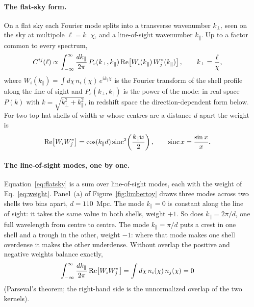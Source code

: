 \documentclass[11pt]{article}
\begin{document}
\paragraph{The flat-sky form.}
On a flat sky each Fourier mode splits into a transverse wavenumber
$k_\perp$, seen on the sky at multipole $\ell = k_\perp \chi$, and
a line-of-sight wavenumber $k_\parallel$.  Up to a factor common to
every spectrum,
\begin{equation}
  C^{ij}(\ell) \propto \int_{-\infty}^{\infty}
  \frac{dk_\parallel}{2\pi}\,
  P_s(k_\perp, k_\parallel)\,
  {\rm Re}\!\left[ W_i(k_\parallel)\, W_j^*(k_\parallel) \right],
  \qquad k_\perp = \frac{\ell}{\chi},
  \label{eq:flatsky}
\end{equation}
where $W_i(k_\parallel) = \int d\chi\, n_i(\chi)\,
e^{i k_\parallel \chi}$ is the Fourier transform of the shell
profile along the line of sight and $P_s(k_\perp, k_\parallel)$ is
the power of the mode: in real space $P(k)$ with
$k = \sqrt{k_\perp^2 + k_\parallel^2}$, in redshift space the
direction-dependent form below.  For two top-hat shells of width
$w$ whose centres are a distance $d$ apart the weight is
\begin{equation}
  {\rm Re}\!\left[ W_i W_j^* \right]
  = \cos(k_\parallel d)\, {\rm sinc}^2\!\left(\frac{k_\parallel w}{2}\right),
  \qquad {\rm sinc}\,x = \frac{\sin x}{x}.
  \label{eq:weight}
\end{equation}

\paragraph{The line-of-sight modes, one by one.}
Equation~\eqref{eq:flatsky} is a sum over line-of-sight modes, each
with the weight of Eq.~\eqref{eq:weight}.  Panel~(a) of
Figure~\ref{fig:limbertoy} draws three modes across two shells two
bins apart, $d = 110$~Mpc.  The mode $k_\parallel = 0$ is constant
along the line of sight: it takes the same value in both shells,
weight $+1$.  So does $k_\parallel = 2\pi/d$, one full wavelength
from centre to centre.  The mode $k_\parallel = \pi/d$ puts a crest
in one shell and a trough in the other, weight $-1$: where that
mode makes one shell overdense it makes the other underdense.
Without overlap the positive and negative weights balance exactly,
\begin{equation}
  \int_{-\infty}^{\infty} \frac{dk_\parallel}{2\pi}\,
  {\rm Re}\!\left[ W_i W_j^* \right]
  = \int d\chi\, n_i(\chi)\, n_j(\chi) = 0
  \label{eq:parseval}
\end{equation}
(Parseval's theorem; the right-hand side is the unnormalized
overlap of the two kernels).
\end{document}
